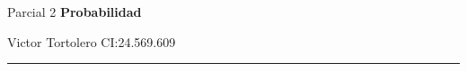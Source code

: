 \documentclass{article}
\begin{document}
\flushleft
\setlength{\parindent}{20pt}

\justify
\centerline{\huge Parcial 2 \textbf{Probabilidad}}
\centerline{Victor Tortolero CI:24.569.609}  %
\vspace{0.1cm}
\hrule



 \newpage

 \newpage

 \newpage
\end{document}
